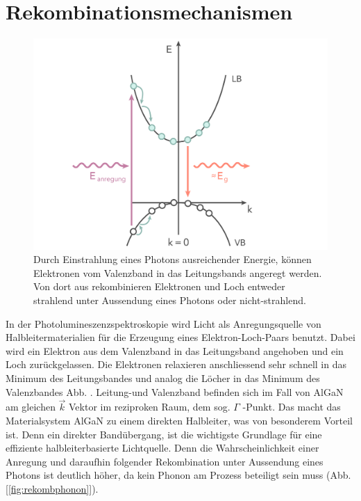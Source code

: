
\thispagestyle{fancy}


\section{Rekombinationsmechanismen}

%
\begin{figure}[h]
\centering
\begin{minipage}[t]{1\linewidth}
\centering
\includegraphics[width=0.8\linewidth]{Bilder/bandrekomb.png}
\end{minipage}%
\caption{Durch Einstrahlung eines Photons ausreichender Energie, können Elektronen vom Valenzband in das Leitungsbands angeregt werden. Von dort aus rekombinieren Elektronen und Loch entweder strahlend unter Aussendung eines Photons oder nicht-strahlend.}
 \label{fig:bandrekomb}
\end{figure}
\raggedright
%
In der Photolumineszenzspektroskopie wird Licht als Anregungsquelle von Halbleitermaterialien für die Erzeugung eines Elektron-Loch-Paars benutzt. Dabei wird ein Elektron aus dem Valenzband in das Leitungsband angehoben und ein Loch zurückgelassen. Die Elektronen relaxieren anschliessend sehr schnell in das Minimum des Leitungsbandes und analog die Löcher in das Minimum des Valenzbandes Abb. . Leitung-und Valenzband befinden sich im Fall von AlGaN am gleichen $\vec{k}$ Vektor im reziproken Raum, dem sog. $\Gamma$ -Punkt. Das macht das Materialsystem AlGaN zu einem direkten Halbleiter, was von besonderem Vorteil ist. Denn ein direkter Bandübergang, ist die wichtigste Grundlage für eine effiziente halbleiterbasierte Lichtquelle. Denn die Wahrscheinlichkeit einer Anregung und daraufhin folgender Rekombination unter Aussendung eines Photons ist deutlich höher, da kein Phonon am Prozess beteiligt sein muss (Abb. [\ref{fig:rekombphonon}]). 
